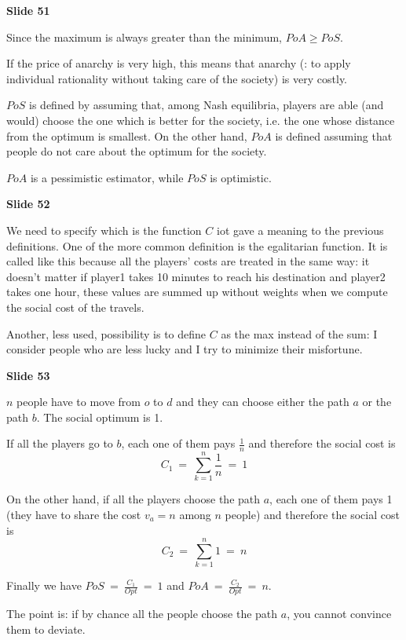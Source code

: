 \documentclass[pt11,a4paper,twoside,reqno,openright]{paper}
\begin{document}
\bigskip
\noindent \textbf{Slide 51}

\noindent Since the maximum is always greater than the minimum, $PoA \geq PoS$.

\noindent If the price of anarchy is very high, this means that anarchy 
(: to apply individual rationality without taking care of the society) is 
very costly. 

\noindent $PoS$ is defined by assuming that, among Nash equilibria, players 
are able (and would) choose the one which is better for the society, i.e. 
the one whose distance from the optimum is smallest. On the other hand, $PoA$ 
is defined assuming that people do not care about the optimum for the society.

\noindent $PoA$ is a pessimistic estimator, while $PoS$ is optimistic.

\bigskip
\noindent \textbf{Slide 52}

\noindent We need to specify which is the function $C$ iot gave a meaning 
to the previous definitions. One of the more common definition is the 
egalitarian function. It is called like this because all the players' costs 
are treated in the same way: it doesn't matter if player1 takes 10 minutes 
to reach his destination and player2 takes one hour, these values are 
summed up without weights when we compute the social cost of the travels.

\noindent Another, less used, possibility is to define $C$ as the max 
instead of the sum: I consider people who are less lucky and I try to 
minimize their misfortune.

\bigskip
\noindent \textbf{Slide 53}

\noindent $n$ people have to move from $o$ to $d$ and they can choose either 
the path $a$ or the path $b$. The social optimum is 1. 

\noindent If all the players go to $b$, each one of them pays $\frac{1}{n}$ 
and therefore the social cost is
\[
	C_1~=~\sum_{k=1}^n{\frac{1}{n}}~=~1
\]

\noindent On the other hand, if all the players choose the path $a$, each one 
of them pays 1 (they have to share the cost $v_a=n$ among $n$ people) and 
therefore the social cost is 
\[
	C_2~=~\sum_{k=1}^n{1}~=~n
\]

\noindent Finally we have $PoS~=~\frac{C_1}{Opt}~=~1$ and 
$PoA~=~\frac{C_2}{Opt}~=~n$.

\noindent The point is: if by chance all the people choose the path $a$, you 
cannot convince them to deviate.
\end{document}
